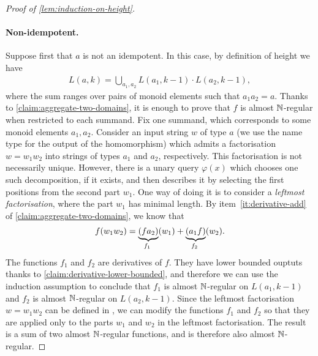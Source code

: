 \begin{proof}[Proof of \cref{lem:induction-on-height}]
\paragraph*{Non-idempotent.} Suppose first that $a$ is not an idempotent. In this case, by definition of  height we have 
\begin{align*}
L(a,k) = \bigcup_{a_1,a_2} L(a_1,k-1) \cdot L(a_2,k-1),
\end{align*}
where the sum ranges over pairs of monoid elements such that $a_1 a_2 =a$.
Thanks to \cref{claim:aggregate-two-domains}, it is enough to prove that $f$ is almost ${\mathbb N}$-regular when restricted to each  summand. Fix one summand, which corresponds to some monoid elements $a_1,a_2$. Consider an input string $w$ of type $a$ (we use the name type for the output of the homomorphism) which admits  a factorisation $w = w_1 w_2$ into strings of types $a_1$ and $a_2$, respectively. This factorisation is not necessarily unique. However, there is a unary query $\varphi(x)$ which chooses one such  decomposition, if it exists, and then describes it by selecting the first positions from the second part $w_1$. One way of doing it is to consider a \emph{leftmost factorisation}, where the part $w_1$ has  minimal length. 
 By item~\ref{it:derivative-add} of \cref{claim:aggregate-two-domains}, we know that 
\begin{align*}
f(w_1 w_2) = \myunderbrace{(f a_2)}{$f_1$}(w_1) + \myunderbrace{(a_1  f)}{$f_2$}(w_2).
\end{align*}
The functions $f_1$ and $f_2$ are derivatives of $f$. They have lower bounded ouptuts thanks to \cref{claim:derivative-lower-bounded}, and  therefore we can use the induction assumption to conclude that $f_1$ is almost ${\mathbb N}$-regular on $L(a_1,k-1)$ and $f_2$ is almost ${\mathbb N}$-regular on $L(a_2,k-1)$. Since the leftmost factorisation $w = w_1 w_2$ can be defined in \mso, we can modify the functions $f_1$ and $f_2$ so that they are applied only to the parts $w_1$ and $w_2$ in the leftmost factorisation. The result is a sum of two almost ${\mathbb N}$-regular functions, and is therefore also almost ${\mathbb N}$-regular.


\end{proof}
